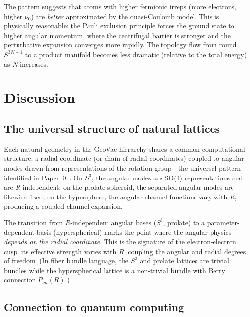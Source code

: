 \documentclass[aps,pra,twocolumn,superscriptaddress,longbibliography]{revtex4-2}
\begin{document}
The pattern suggests that atoms with higher fermionic irreps
(more electrons, higher $\nu_0$) are \emph{better} approximated
by the quasi-Coulomb model.  This is physically reasonable:
the Pauli exclusion principle forces the ground state to higher
angular momentum, where the centrifugal barrier is stronger and
the perturbative expansion converges more rapidly.  The topology
flow from round $S^{3N-1}$ to a product manifold becomes less
dramatic (relative to the total energy) as $N$ increases.



\section{Discussion}
\label{sec:discussion}

\subsection{The universal structure of natural lattices}

Each natural geometry in the GeoVac hierarchy shares a common
computational structure: a radial coordinate (or chain of radial
coordinates) coupled to angular modes drawn from representations of
the rotation group---the universal pattern identified in
Paper~0~\cite{loutey_paper0}.  On $S^3$, the angular modes are SO(4)
representations and are $R$-independent; on the prolate spheroid, the
separated angular modes are likewise fixed; on the hypersphere, the
angular channel functions vary with $R$, producing a coupled-channel
expansion.

The transition from $R$-independent angular bases ($S^3$, prolate) to
a parameter-dependent basis (hyperspherical) marks the point where the
angular physics \emph{depends on the radial coordinate}.  This is the
signature of the electron-electron cusp: its effective strength varies
with $R$, coupling the angular and radial degrees of freedom.
(In fiber bundle language, the $S^3$ and prolate lattices are trivial
bundles while the hyperspherical lattice is a non-trivial bundle with
Berry connection $P_{\nu\mu}(R)$.)

\subsection{Connection to quantum computing}
\end{document}
